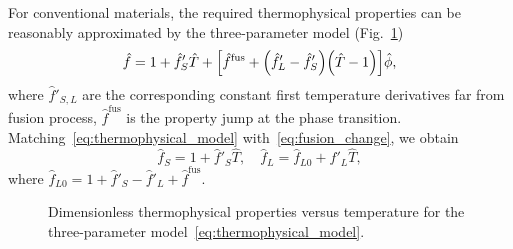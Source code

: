 \documentclass{article}
\newcommand{\fusion}[1]{{#1}^\mathrm{fus}}
\begin{document}
For conventional materials, the required thermophysical properties can be reasonably approximated
by the three-parameter model (Fig.~\ref{fig:thermophysical})
\begin{equation}\label{eq:thermophysical_model}
	\hat{f} = 1 + \hat{f}'_S\hat{T} + \qty[
	    \fusion{\hat{f}} + \qty(\hat{f}'_L - \hat{f}'_S) \qty(\hat{T} - 1)
	]\hat{\phi},
\end{equation}
where \(\hat{f}'_{S,L}\) are the corresponding constant first temperature derivatives far from fusion process,
\(\fusion{\hat{f}}\) is the property jump at the phase transition.
Matching~\eqref{eq:thermophysical_model} with~\eqref{eq:fusion_change}, we obtain
\begin{equation}\label{eq:thermophysical_model_explicit}
	\hat{f}_S = 1 + \hat{f}'_S\hat{T}, \quad
	\hat{f}_L = \hat{f}_{L0} + \hat{f}'_L\hat{T},
\end{equation}
where \(\hat{f}_{L0} = 1 + \hat{f}'_S - \hat{f}'_L + \fusion{\hat{f}}\).

\begin{figure}
    \centering
    \caption{Dimensionless thermophysical properties versus temperature for the three-parameter model~\eqref{eq:thermophysical_model}.}
    \label{fig:thermophysical}
\end{figure}
\end{document}
